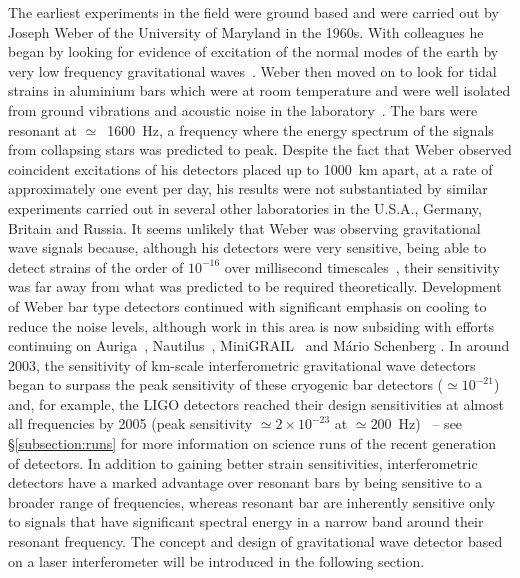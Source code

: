\documentclass{article}
\begin{document}
The earliest experiments in the field were ground based and were carried out by
Joseph Weber of the University of Maryland in the 1960s. With colleagues he
began by looking for evidence of excitation of the normal modes of the earth by
very low frequency gravitational waves~\cite{Forward2}. Weber then moved on to
look for tidal strains in aluminium bars which were at room temperature and were
well isolated from ground vibrations and acoustic noise in the
laboratory~\cite{Weber1, Weber2}. The bars were resonant at $\simeq$~1600~Hz, a
frequency where the energy spectrum of the signals from collapsing stars was
predicted to peak. Despite the fact that Weber observed coincident excitations
of his detectors placed up to 1000~km apart, at a rate of approximately one
event per day, his results were not substantiated by similar experiments carried
out in several other laboratories in the U.S.A., Germany, Britain and Russia. It
seems unlikely that Weber was observing gravitational wave signals because,
although his detectors were very sensitive, being able to detect strains of the
order of $10^{-16}$ over millisecond timescales~\cite{Weber1}, their sensitivity
was far away from what was predicted to be required theoretically. Development
of Weber bar type detectors continued with significant emphasis on cooling to
reduce the noise levels, although work in this area is now subsiding with
efforts continuing on Auriga~\cite{AURIGA}, Nautilus~\cite{NAUTILUS},
MiniGRAIL~\cite{MiniGRAIL, Gottardi:2007} and M\'{a}rio Schenberg
\cite{Schenberg, Aguiar:2006}.  In around 2003, the sensitivity of km-scale
interferometric gravitational wave detectors began to surpass the peak
sensitivity of these cryogenic bar detectors ($\simeq 10^{-21}$)
and, for example, the LIGO detectors reached their design sensitivities at
almost all frequencies by 2005 (peak sensitivity $\simeq 2\times10^{-23}$ at
$\simeq200$~Hz)~\cite{Whitcomb:2008} -- see \S\ref{subsection:runs} for more
information on science runs of the recent generation of detectors.  In addition
to gaining better strain sensitivities, interferometric detectors have a marked
advantage over resonant bars by being sensitive to a broader range of
frequencies, whereas resonant bar are inherently sensitive only to signals that
have significant spectral energy in a narrow band around their resonant
frequency. The concept and design of gravitational wave detector based on a
laser interferometer will be introduced in the following section.


\end{document}
